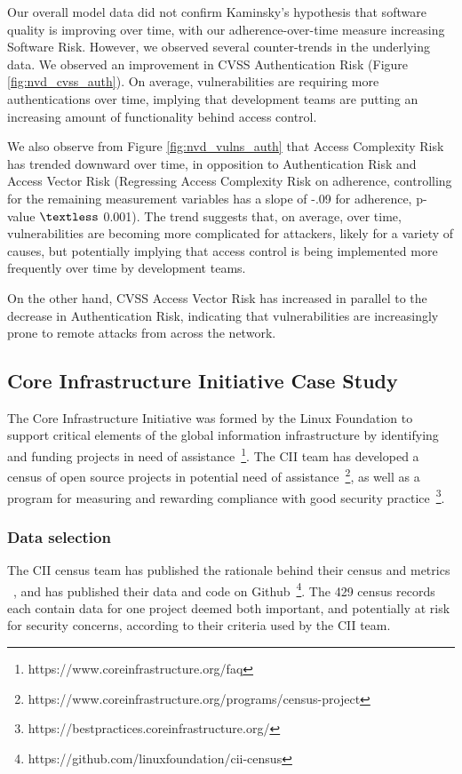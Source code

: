 Our overall model data did not confirm Kaminsky's hypothesis that software quality is improving over time, with our adherence-over-time measure increasing Software Risk. However, we observed several counter-trends in the underlying data. We observed an improvement in CVSS Authentication Risk (Figure \ref{fig:nvd_cvss_auth}). On average, vulnerabilities are requiring more authentications over time, implying that development teams are putting an increasing amount of functionality behind access control.

We also observe from Figure \ref{fig:nvd_vulns_auth} that Access Complexity Risk has trended downward over time, in opposition to Authentication Risk and Access Vector Risk (Regressing Access Complexity Risk on adherence, controlling for the remaining measurement variables has a slope of -.09 for adherence, p-value $\textless$ 0.001). The trend suggests that, on average, over time, vulnerabilities are becoming more complicated for attackers, likely for a variety of causes, but potentially implying that access control is being implemented more frequently over time by development teams.

On the other hand, CVSS Access Vector Risk has increased in parallel to the decrease in Authentication Risk, indicating that vulnerabilities are increasingly prone to remote attacks from across the network.

 

\subsection{Core Infrastructure Initiative Case Study}

The Core Infrastructure Initiative was formed by the Linux Foundation to support critical elements of the global information infrastructure by identifying and funding projects in need of assistance~\footnote{https://www.coreinfrastructure.org/faq}. The CII team has developed a census of open source projects in potential need of assistance~\footnote{https://www.coreinfrastructure.org/programs/census-project}, as well as a program for measuring and rewarding compliance with good security practice~\footnote{https://bestpractices.coreinfrastructure.org/}.

\subsubsection{Data selection}
The CII census team has published the rationale behind their census and metrics ~\cite{wheeler2015open}, and has published their data and code on Github~\footnote{https://github.com/linuxfoundation/cii-census}. The 429 census records each contain data for one project deemed both important, and potentially at risk for security concerns, according to their criteria used by the CII team.

